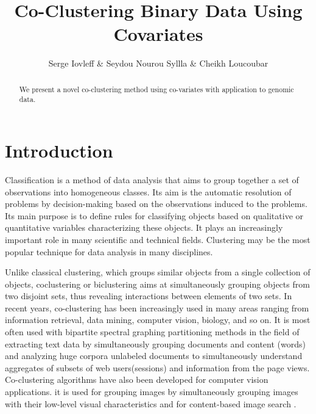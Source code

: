 \documentclass[a4paper]{article}
\title{Co-Clustering Binary Data Using Covariates}
\author{Serge Iovleff  \& Seydou Nourou Syllla \& Cheikh Loucoubar}
\begin{document}
\maketitle

\begin{abstract}
We present a novel co-clustering method using co-variates with application to genomic data.
\end{abstract}

\tableofcontents

\section{Introduction}

Classification is a method of data analysis that aims to group together a set of observations into homogeneous
classes. Its aim is the automatic resolution of problems by decision-making based on the observations induced to the
problems. Its main purpose is to define rules for classifying objects based on qualitative or quantitative variables
characterizing these objects. It plays an increasingly important role in many scientific and technical fields.
Clustering may be the most popular technique for data analysis in many disciplines.

Unlike classical clustering, which groups similar objects from a single collection of objects, coclustering or biclustering \cite{madeira2004biclustering} aims at simultaneously grouping objects from two disjoint sets, thus revealing interactions between elements of two sets. In recent years, co-clustering has been increasingly used
in many areas ranging from information retrieval, data mining, computer vision, biology, and so on.
It is most often used with bipartite spectral graphing partitioning methods in the field of \cite{Dhillon01}
extracting text data by simultaneously grouping documents and content (words) and analyzing huge corpora unlabeled
documents \cite{xu2010co} to simultaneously understand aggregates of subsets of web users(sessions) and information
from the page views.
Co-clustering algorithms have also been developed for computer vision applications.
it is used for grouping images by simultaneously grouping images with their low-level visual characteristics and for content-based image search \cite{guan2005spectral}\cite{rasiwasia2009holistic} \cite{ qiu2004image}.
\end{document}
